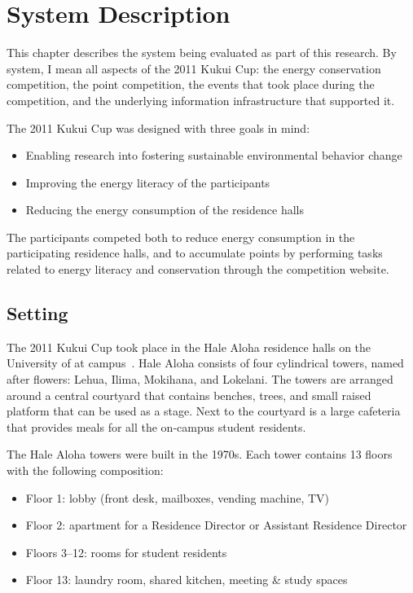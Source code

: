 \chapter{System Description}
\label{cha:system-description}

This chapter describes the system being evaluated as part of this research. By system, I mean all aspects of the 2011 Kukui Cup: the energy conservation competition, the point competition, the events that took place during the competition, and the underlying information infrastructure that supported it.

The 2011 Kukui Cup was designed with three goals in mind:

\begin{itemize}
	\item Enabling research into fostering sustainable environmental behavior change
	\item Improving the energy literacy of the participants
	\item Reducing the energy consumption of the residence halls
\end{itemize}

The participants competed both to reduce energy consumption in the participating residence halls, and to accumulate points by performing tasks related to energy literacy and conservation through the competition website.

\section{Setting}
\label{sec:setting}

The 2011 Kukui Cup took place in the Hale Aloha residence halls on the University of \Hawaii at \Manoa campus~\cite{hale-aloha-website}. Hale Aloha consists of four cylindrical towers, named after \Hawaiian flowers: Lehua, Ilima, Mokihana, and Lokelani. The towers are arranged around a central courtyard that contains benches, trees, and small raised platform that can be used as a stage. Next to the courtyard is a large cafeteria that provides meals for all the on-campus student residents.

The Hale Aloha towers were built in the 1970s. Each tower contains 13 floors with the following composition:

\begin{itemize}
	\item Floor 1: lobby (front desk, mailboxes, vending machine, TV)
	\item Floor 2: apartment for a Residence Director or Assistant Residence Director
	\item Floors 3--12: rooms for student residents
	\item Floor 13: laundry room, shared kitchen, meeting \& study spaces
\end{itemize}

